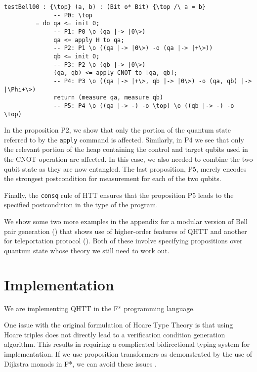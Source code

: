 \documentclass[acmsmall,nonacm,timestamp,review=false,anonymous=false]{acmart}
\begin{document}
\begin{lstlisting}[language=QHaskell]
testBell00 : {\top} (a, b) : (Bit o* Bit) {\top /\ a = b}
              -- P0: \top
         = do qa <= init 0;
              -- P1: P0 \o (qa |-> |0\>)
              qa <= apply H to qa;
              -- P2: P1 \o ((qa |-> |0\>) -o (qa |-> |+\>))
              qb <= init 0;
              -- P3: P2 \o (qb |-> |0\>)
              (qa, qb) <= apply CNOT to [qa, qb];
              -- P4: P3 \o ((qa |-> |+\>, qb |-> |0\>) -o (qa, qb) |-> |\Phi+\>)
              return (measure qa, measure qb)
              -- P5: P4 \o ((qa |-> -) -o \top) \o ((qb |-> -) -o \top)
\end{lstlisting}

In the proposition P2, we show that only the portion of the quantum state referred to by the \texttt{apply} command is affected. Similarly, in P4 we see that only the relevant portion of the heap containing the control and target qubits used in the CNOT operation are affected. In this case, we also needed to combine the two qubit state as they are now entangled. The last proposition, P5, merely encodes the strongest postcondition for measurement for each of the two qubits.

Finally, the \texttt{consq} rule of HTT ensures that the proposition P5 leads to the specified postcondition in the type of the program.

We show some two more examples in the appendix for a modular version of Bell pair generation () that shows use of higher-order features of QHTT and another for teleportation protocol (). Both of these involve specifying propositions over quantum state whose theory we still need to work out.


\section{Implementation}
We are implementing QHTT in the F* programming language.

One issue with the original formulation of Hoare Type Theory is that using Hoare triples does not directly lead to a verification condition generation algorithm. This results in requiring a complicated bidirectional typing system for implementation. If we use proposition transformers as demonstrated by the use of Dijkstra monads in F*, we can avoid these issues \cite{swamy2013verifying}.
\end{document}
